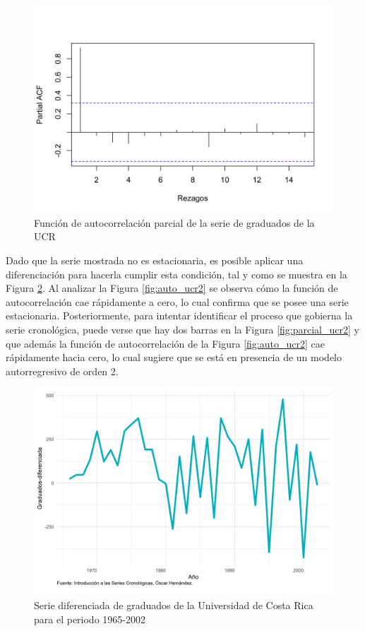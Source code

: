 \documentclass[
]{article}
\begin{document}
\begin{figure}[H]
\includegraphics[width=1\linewidth,height=1\textheight]{Tesis_files/figure-latex/parcial_ucr1-1} \caption{Función de autocorrelación parcial de la serie de graduados de la UCR}\label{fig:parcial_ucr1}
\end{figure}

Dado que la serie mostrada no es estacionaria, es posible aplicar una
diferenciación para hacerla cumplir esta condición, tal y como se
muestra en la Figura \ref{fig:ejemplo_ucr_diferenciada}. Al analizar la
Figura \ref{fig:auto_ucr2} se observa cómo la función de autocorrelación
cae rápidamente a cero, lo cual confirma que se posee una serie
estacionaria. Posteriormente, para intentar identificar el proceso que
gobierna la serie cronológica, puede verse que hay dos barras en la
Figura \ref{fig:parcial_ucr2} y que además la función de autocorrelación
de la Figura \ref{fig:auto_ucr2} cae rápidamente hacia cero, lo cual
sugiere que se está en presencia de un modelo autorregresivo de orden 2.

\begin{figure}[H]
\includegraphics[width=1\linewidth,height=1\textheight]{Tesis_files/figure-latex/ejemplo_ucr_diferenciada-1} \caption{Serie diferenciada de graduados de la Universidad de Costa Rica para el periodo 1965-2002}\label{fig:ejemplo_ucr_diferenciada}
\end{figure}
\end{document}
